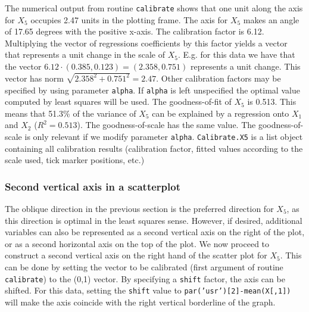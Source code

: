 \documentclass[a4paper]{article}
\begin{document}
The numerical output from routine {\tt calibrate} shows that one unit along the axis for $X_5$ occupies 2.47
units in the plotting frame. The axis for $X_5$ makes an angle of 17.65 degrees with the positive x-axis.
The calibration factor is 6.12. Multiplying the vector of regressions coefficients by this
factor yields a vector that represents a unit change in the scale of $X_5$. E.g. for this data we have that 
the vector $6.12 \cdot (0.385, 0.123) = (2.358, 0.751)$ represents a unit change. This vector has
norm $\sqrt{2.358^2 + 0.751^2} = 2.47$. Other calibration factors may be specified by using parameter
{\tt alpha}. If {\tt alpha} is left unspecified the optimal value computed by least
squares will be used. The goodness-of-fit of $X_5$ is 0.513. This means that 51.3\% of the variance
of $X_5$ can be explained by a regression onto $X_1$ and $X_2$ ($R^2 = 0.513$). The goodness-of-scale has
the same value. The goodness-of-scale is only relevant if we modify parameter {\tt alpha}. {\tt Calibrate.X5}
is a list object containing all calibration results (calibration factor, fitted values according to the
scale used, tick marker positions, etc.)

\subsubsection*{Second vertical axis in a scatterplot}

The oblique direction in the previous section is the preferred direction for $X_5$, as this direction
is optimal in the least squares sense. However, if desired, additional variables can also be represented
as a second vertical axis on the right of the plot, or as a second horizontal axis on the top of the
plot. We now proceed to construct a second vertical axis on the right hand of the scatter plot for
$X_5$. This can be done by setting the vector to be calibrated (first argument of routine {\tt calibrate})
to the (0,1) vector. By specifying a {\tt shift} factor, the axis can be shifted. For this data, setting
the {\tt shift} value to {\tt par('usr')[2]-mean(X[,1])} will make the axis coincide with the right vertical
borderline of the graph.
\end{document}

